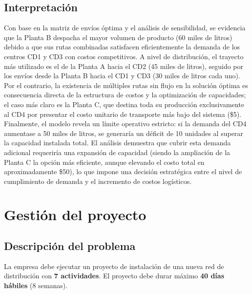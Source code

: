 \documentclass[12pt]{article}
\begin{document}
\subsection{Interpretación}
Con base en la matriz de envíos óptima y el análisis de sensibilidad, se evidencia que la Planta B despacha el mayor volumen de producto (60 miles de litros) debido a que sus rutas combinadas satisfacen eficientemente la demanda de los centros CD1 y CD3 con costos competitivos. A nivel de distribución, el trayecto más utilizado es el de la Planta A hacia el CD2 (45 miles de litros), seguido por los envíos desde la Planta B hacia el CD1 y CD3 (30 miles de litros cada uno). Por el contrario, la existencia de múltiples rutas sin flujo en la solución óptima es consecuencia directa de la estructura de costos y la optimización de capacidades; el caso más claro es la Planta C, que destina toda su producción exclusivamente al CD4 por presentar el costo unitario de transporte más bajo del sistema (\$5). Finalmente, el modelo revela un límite operativo estricto: si la demanda del CD4 aumentase a 50 miles de litros, se generaría un déficit de 10 unidades al superar la capacidad instalada total. El análisis demuestra que cubrir esta demanda adicional requeriría una expansión de capacidad (siendo la ampliación de la Planta C la opción más eficiente, aunque elevando el costo total en aproximadamente \$50), lo que impone una decisión estratégica entre el nivel de cumplimiento de demanda y el incremento de costos logísticos.

\section{Gestión del proyecto}

\subsection{Descripción del problema}
La empresa debe ejecutar un proyecto de instalación de una nueva red de distribución con \textbf{7 actividades}. El proyecto debe durar máximo \textbf{40 días hábiles} (8 semanas).
\end{document}
